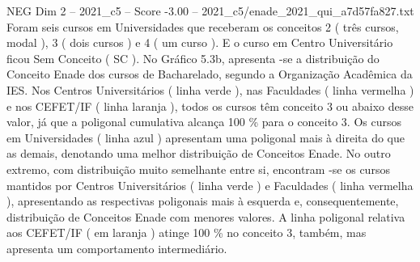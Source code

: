 \begin{textsample}{NEG Dim 2 – 2021\_c5 – Score -3.00 – 2021\_c5/enade\_2021\_qui\_a7d57fa827.txt}
Foram seis cursos em Universidades que receberam os conceitos 2 ( três cursos, modal ), 3 ( dois cursos ) e 4 ( um curso ).
E o curso em Centro Universitário ficou Sem Conceito ( SC ).
No Gráfico 5.3b, apresenta -se a distribuição do Conceito Enade dos cursos de Bacharelado, segundo a Organização Acadêmica da IES.
Nos Centros Universitários ( linha verde ), nas Faculdades ( linha vermelha ) e nos CEFET/IF ( linha laranja ), todos os cursos têm conceito 3 ou abaixo desse valor, já que a poligonal cumulativa alcança 100 \% para o conceito 3.
Os cursos em Universidades ( linha azul ) apresentam uma poligonal mais à direita do que as demais, denotando uma melhor distribuição de Conceitos Enade.
No outro extremo, com distribuição muito semelhante entre si, encontram -se os cursos mantidos por Centros Universitários ( linha verde ) e Faculdades ( linha vermelha ), apresentando as respectivas poligonais mais à esquerda e, consequentemente, distribuição de Conceitos Enade com menores valores.
A linha poligonal relativa aos CEFET/IF ( em laranja ) atinge 100 \% no conceito 3, também, mas apresenta um comportamento intermediário.

\end{textsample}

